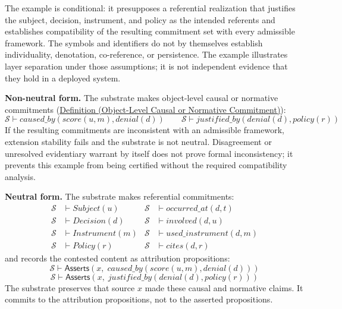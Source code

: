 \documentclass[11pt]{article}
\theoremstyle{plain}
\theoremstyle{definition}
\theoremstyle{remark}
\newcommand{\DefRef}[2]{\hyperref[#1]{Definition (#2)}}
\newcommand{\Substrate}{\mathcal{S}}
\newcommand{\entails}{\vdash}
\newcommand{\Asserts}{\mathsf{Asserts}}
\newcommand{\pred}[1]{\mathit{#1}}
\begin{document}
The example is conditional: it presupposes a referential realization
that justifies the subject, decision, instrument, and policy as the
intended referents and establishes compatibility of the resulting
commitment set with every admissible framework.
The symbols and identifiers do not by themselves establish
individuality, denotation, co-reference, or persistence.
The example illustrates layer separation under those assumptions;
it is not independent evidence that they hold in a deployed system.

\textbf{Non-neutral form.}
The substrate makes object-level causal or normative commitments
(\DefRef{se100.def.ObjectLevelCausalNormativeCommitment}
{Object-Level Causal or Normative Commitment}):
\[
  \Substrate \entails \pred{caused\_by}(\pred{score}(u,m), \pred{denial}(d))
  \qquad
  \Substrate \entails \pred{justified\_by}(\pred{denial}(d), \pred{policy}(r))
\]
If the resulting commitments are inconsistent with an admissible
framework, extension stability fails and the substrate is not neutral.
Disagreement or unresolved evidentiary warrant by itself does not prove
formal inconsistency; it prevents this example from being certified
without the required compatibility analysis.

\textbf{Neutral form.}
The substrate makes referential commitments:
\begin{align*}
  \Substrate & \entails \pred{Subject}(u)
             & \Substrate                    & \entails \pred{occurred\_at}(d,t)     \\
  \Substrate & \entails \pred{Decision}(d)
             & \Substrate                    & \entails \pred{involved}(d,u)         \\
  \Substrate & \entails \pred{Instrument}(m)
             & \Substrate                    & \entails \pred{used\_instrument}(d,m) \\
  \Substrate & \entails \pred{Policy}(r)
             & \Substrate                    & \entails \pred{cites}(d,r)
\end{align*}
and records the contested content as attribution propositions:
\[
  \Substrate \entails \Asserts(x,\;
  \pred{caused\_by}(\pred{score}(u,m), \pred{denial}(d)))
\]
\[
  \Substrate \entails \Asserts(x,\;
  \pred{justified\_by}(\pred{denial}(d), \pred{policy}(r)))
\]
The substrate preserves that source $x$
made these causal and normative claims.
It commits to the attribution propositions,
not to the asserted propositions.
\end{document}
